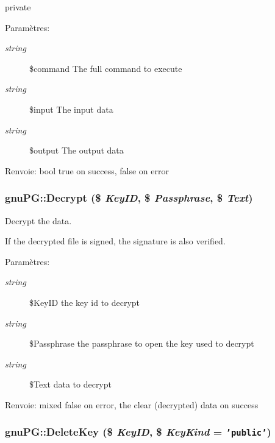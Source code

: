 private \begin{Desc}
\item[Param\`{e}tres:]
\begin{description}
\item[{\em string}]\$command The full command to execute \item[{\em string}]\$input The input data \item[{\em string}]\$output The output data \end{description}
\end{Desc}
\begin{Desc}
\item[Renvoie:]bool true on success, false on error\end{Desc}
\hypertarget{classgnuPG_a7}{
\subsubsection[Decrypt]{\setlength{\rightskip}{0pt plus 5cm}gnu\-PG::Decrypt (\$ {\em Key\-ID}, \$ {\em Passphrase}, \$ {\em Text})}}
\label{classgnuPG_a7}


Decrypt the data.

If the decrypted file is signed, the signature is also verified.

\begin{Desc}
\item[Param\`{e}tres:]
\begin{description}
\item[{\em string}]\$Key\-ID the key id to decrypt \item[{\em string}]\$Passphrase the passphrase to open the key used to decrypt \item[{\em string}]\$Text data to decrypt \end{description}
\end{Desc}
\begin{Desc}
\item[Renvoie:]mixed false on error, the clear (decrypted) data on success\end{Desc}
\hypertarget{classgnuPG_a8}{
\subsubsection[DeleteKey]{\setlength{\rightskip}{0pt plus 5cm}gnu\-PG::Delete\-Key (\$ {\em Key\-ID}, \$ {\em Key\-Kind} = {\tt 'public'})}}
\label{classgnuPG_a8}


